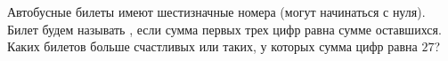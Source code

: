 Автобусные билеты имеют шестизначные номера (могут начинаться с нуля). Билет будем называть
, если сумма первых трех цифр равна сумме оставшихся. Каких билетов больше счастливых
или таких, у которых сумма цифр равна $27$?
